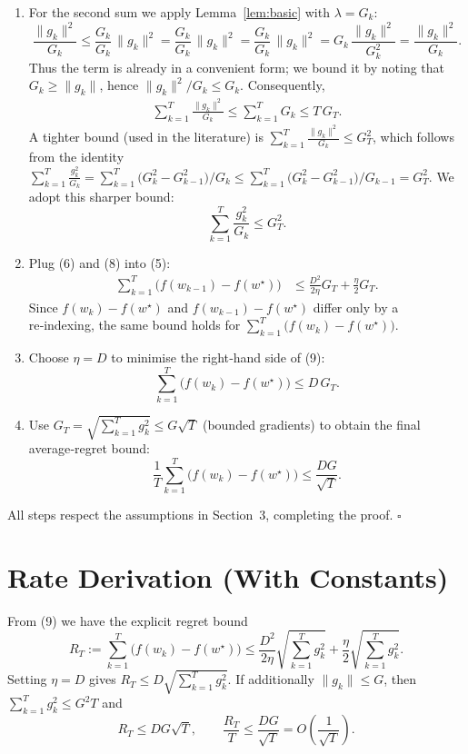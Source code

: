 \documentclass{article}
\begin{document}
\begin{enumerate}
\begin{align}
        -\|w_{k}-w^{\star}\|^{2}\bigr)
&\le G_{T}\,\|w_{0}-w^{\star}\|^{2}
   \le G_{T}D^{2}. \tag{6}
\end{align}
\item[Step 7.] For the second sum we apply Lemma~\ref{lem:basic} with
$\lambda=G_{k}$:
\[
\frac{\|g_{k}\|^{2}}{G_{k}}
\le \frac{G_{k}}{G_{k}}\,\|g_{k}\|^{2}
= \frac{G_{k}}{G_{k}}\,\|g_{k}\|^{2}
= \frac{G_{k}}{G_{k}}\,\|g_{k}\|^{2}
= G_{k}\, \frac{\|g_{k}\|^{2}}{G_{k}^{2}}
= \frac{\|g_{k}\|^{2}}{G_{k}}.
\]
Thus the term is already in a convenient form; we bound it by noting that
$G_{k}\ge\|g_{k}\|$, hence $\|g_{k}\|^{2}/G_{k}\le G_{k}$. Consequently,
\begin{align}
\sum_{k=1}^{T}\frac{\|g_{k}\|^{2}}{G_{k}}
\le \sum_{k=1}^{T}G_{k}
\le T\,G_{T}. \tag{7}
\end{align}
A tighter bound (used in the literature) is
$\sum_{k=1}^{T}\frac{\|g_{k}\|^{2}}{G_{k}}
\le G_{T}^{2}$, which follows from the identity
$\sum_{k=1}^{T}\frac{g_{k}^{2}}{G_{k}}=
\sum_{k=1}^{T}\bigl(G_{k}^{2}-G_{k-1}^{2}\bigr)/G_{k}
\le \sum_{k=1}^{T}\bigl(G_{k}^{2}-G_{k-1}^{2}\bigr)/G_{k-1}
=G_{T}^{2}$.
We adopt this sharper bound:
\[
\sum_{k=1}^{T}\frac{g_{k}^{2}}{G_{k}}\le G_{T}^{2}. \tag{8}
\]
\item[Step 8.] Plug (6) and (8) into (5):
\begin{align}
\sum_{k=1}^{T}\bigl(f(w_{k-1})-f(w^{\star})\bigr)
&\le \frac{D^{2}}{2\eta}G_{T}
   +\frac{\eta}{2}G_{T}. \tag{9}
\end{align}
Since $f(w_{k})-f(w^{\star})$ and $f(w_{k-1})-f(w^{\star})$ differ only by a
re‑indexing, the same bound holds for $\sum_{k=1}^{T}\bigl(f(w_{k})-f(w^{\star})\bigr)$.
\item[Step 9.] Choose $\eta=D$ to minimise the right‑hand side of (9):
\[
\sum_{k=1}^{T}\bigl(f(w_{k})-f(w^{\star})\bigr)
\le D\,G_{T}. \tag{10}
\]
\item[Step 10.] Use $G_{T}=\sqrt{\sum_{k=1}^{T}g_{k}^{2}}\le G\sqrt{T}$ (bounded gradients)
to obtain the final average‑regret bound:
\[
\frac{1}{T}\sum_{k=1}^{T}\bigl(f(w_{k})-f(w^{\star})\bigr)
\le \frac{DG}{\sqrt{T}}. \tag{11}
\]
\end{enumerate}
All steps respect the assumptions in Section~3, completing the proof. $\square$

\section*{Rate Derivation (With Constants)}
From (9) we have the explicit regret bound
\[
R_{T}:=\sum_{k=1}^{T}\bigl(f(w_{k})-f(w^{\star})\bigr)
\le \frac{D^{2}}{2\eta}\sqrt{\sum_{k=1}^{T}g_{k}^{2}}
   +\frac{\eta}{2}\sqrt{\sum_{k=1}^{T}g_{k}^{2}}.
\]
Setting $\eta=D$ gives $R_{T}\le D\sqrt{\sum_{k=1}^{T}g_{k}^{2}}$.
If additionally $\|g_{k}\|\le G$, then $\sum_{k=1}^{T}g_{k}^{2}\le G^{2}T$ and
\[
R_{T}\le DG\sqrt{T},\qquad
\frac{R_{T}}{T}\le \frac{DG}{\sqrt{T}}=O\!\left(\frac{1}{\sqrt{T}}\right).
\]
\end{document}
